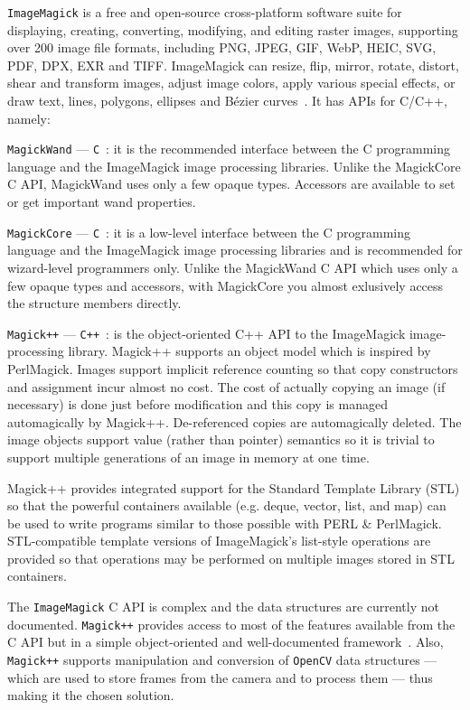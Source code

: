 \texttt{ImageMagick} is a free and open-source cross-platform software suite for
displaying, creating, converting, modifying, and editing raster images,
supporting over 200 image file formats, including PNG, JPEG, GIF, WebP, HEIC,
SVG, PDF, DPX, EXR and TIFF. ImageMagick can resize, flip, mirror, rotate,
distort, shear and transform images, adjust image colors, apply various special
effects, or draw text, lines, polygons, ellipses and Bézier
curves~\cite{imageMagick}. It has APIs for C/C++, namely:
\begin{enum-c}
\item \texttt{MagickWand} --- \texttt{C}~\cite{MagickWand}: it is the recommended interface between the C
  programming language and the ImageMagick image processing libraries. Unlike
  the MagickCore C API, MagickWand uses only a few opaque types. Accessors are
  available to set or get important wand properties.
\item \texttt{MagickCore} --- \texttt{C}~\cite{MagickCore}: it is a low-level interface between
  the C programming language and the ImageMagick image processing libraries and
  is recommended for wizard-level programmers only. Unlike the MagickWand C API
  which uses only a few opaque types and accessors, with MagickCore you almost
  exlusively access the structure members directly.
\item \texttt{Magick++} --- \texttt{C++}~\cite{Magick++}: is the object-oriented C++ API to the
  ImageMagick image-processing library. Magick++ supports an object model which is inspired by PerlMagick. Images support implicit reference counting so that copy constructors and assignment incur almost no cost. The cost of actually copying an image (if necessary) is done just before modification and this copy is managed automagically by Magick++. De-referenced copies are automagically deleted. The image objects support value (rather than pointer) semantics so it is trivial to support multiple generations of an image in memory at one time.

Magick++ provides integrated support for the Standard Template Library (STL) so
that the powerful containers available (e.g. deque, vector, list, and map) can
be used to write programs similar to those possible with PERL \&
PerlMagick. STL-compatible template versions of ImageMagick's list-style
operations are provided so that operations may be performed on multiple images
stored in STL containers.
\end{enum-c}

The \texttt{ImageMagick} C API is complex and the data structures are currently
not documented. \texttt{Magick++} provides access to most of the features
available from the C API but in a simple object-oriented and well-documented
framework~\cite{Magick++Docs}. Also, \texttt{Magick++} supports manipulation and
conversion of \texttt{OpenCV} data structures --- which are used to store frames
from the camera and to process them --- thus making it the chosen solution.
